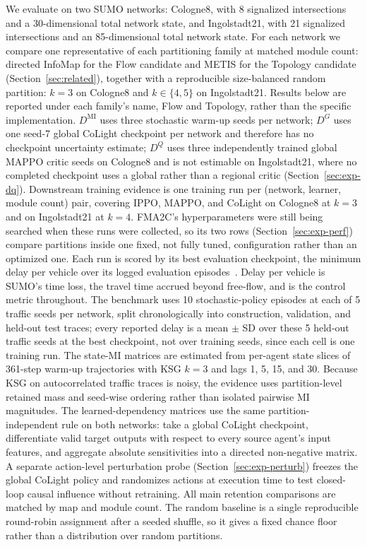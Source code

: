 \documentclass[journal]{IEEEtran}
\theoremstyle{definition}
\begin{document}
We evaluate on two SUMO networks: Cologne8, with 8 signalized intersections and a 30-dimensional total network state, and Ingolstadt21, with 21 signalized intersections and an 85-dimensional total network state. For each network we compare one representative of each partitioning family at matched module count: directed InfoMap for the Flow candidate and METIS for the Topology candidate (Section~\ref{sec:related}), together with a reproducible size-balanced random partition: $k=3$ on Cologne8 and $k\in\{4,5\}$ on Ingolstadt21. Results below are reported under each family's name, Flow and Topology, rather than the specific implementation. $D^{\mathrm{MI}}$ uses three stochastic warm-up seeds per network; $D^G$ uses one seed-7 global CoLight checkpoint per network and therefore has no checkpoint uncertainty estimate; $D^Q$ uses three independently trained global MAPPO critic seeds on Cologne8 and is not estimable on Ingolstadt21, where no completed checkpoint uses a global rather than a regional critic (Section~\ref{sec:exp-dq}). Downstream training evidence is one training run per (network, learner, module count) pair, covering IPPO, MAPPO, and CoLight on Cologne8 at $k=3$ and on Ingolstadt21 at $k=4$. FMA2C's hyperparameters were still being searched when these runs were collected, so its two rows (Section~\ref{sec:exp-perf}) compare partitions inside one fixed, not fully tuned, configuration rather than an optimized one. Each run is scored by its best evaluation checkpoint, the minimum delay per vehicle over its logged evaluation episodes~\citep{henderson2018matters,agarwal2021rliable}. Delay per vehicle is SUMO's time loss, the travel time accrued beyond free-flow, and is the control metric throughout. The benchmark uses 10 stochastic-policy episodes at each of 5 traffic seeds per network, split chronologically into construction, validation, and held-out test traces; every reported delay is a mean $\pm$ SD over these 5 held-out traffic seeds at the best checkpoint, not over training seeds, since each cell is one training run. The state-MI matrices are estimated from per-agent state slices of 361-step warm-up trajectories with KSG $k=3$ and lags 1, 5, 15, and 30. Because KSG on autocorrelated traffic traces is noisy, the evidence uses partition-level retained mass and seed-wise ordering rather than isolated pairwise MI magnitudes. The learned-dependency matrices use the same partition-independent rule on both networks: take a global CoLight checkpoint, differentiate valid target outputs with respect to every source agent's input features, and aggregate absolute sensitivities into a directed non-negative matrix. A separate action-level perturbation probe (Section~\ref{sec:exp-perturb}) freezes the global CoLight policy and randomizes actions at execution time to test closed-loop causal influence without retraining. All main retention comparisons are matched by map and module count. The random baseline is a single reproducible round-robin assignment after a seeded shuffle, so it gives a fixed chance floor rather than a distribution over random partitions.
\end{document}
